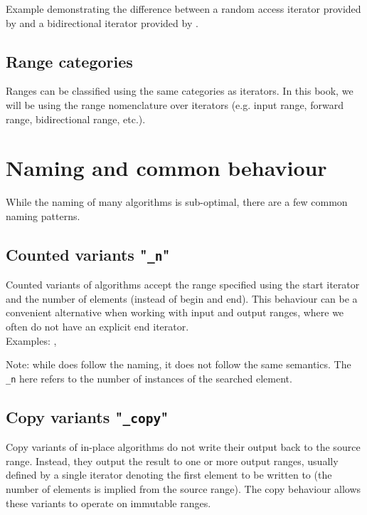 \begin{box-note}
\footnotesize Example demonstrating the difference between a random access iterator provided by  and a bidirectional iterator provided by .
\tcblower
{}
\end{box-note}

\subsection{Range categories}

Ranges can be classified using the same categories as iterators. In this book, we will be using the range nomenclature over iterators (e.g. input range, forward range, bidirectional range, etc.).

\section{Naming and common behaviour}

While the naming of many algorithms is sub-optimal, there are a few common naming patterns.

\subsection{Counted variants "\texttt{\_n}"}

Counted variants of algorithms accept the range specified using the start iterator and the number of elements (instead of begin and end). This behaviour can be a convenient alternative when working with input and output ranges, where we often do not have an explicit end iterator.\\

\noindent Examples: , \\

\noindent Note: while  does follow the naming, it does not follow the same semantics. The \texttt{\_n} here refers to the number of instances of the searched element.

\subsection{Copy variants "\texttt{\_copy}"}

Copy variants of in-place algorithms do not write their output back to the source range. Instead, they output the result to one or more output ranges, usually defined by a single iterator denoting the first element to be written to (the number of elements is implied from the source range). The copy behaviour allows these variants to operate on immutable ranges.\\

